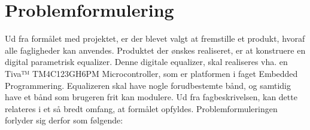 \section{Problemformulering}
%
%


%
Ud fra formålet med projektet, er der blevet valgt at fremstille et produkt, hvoraf alle fagligheder kan anvendes. Produktet der ønskes realiseret, er at konstruere en digital parametrisk equalizer. Denne digitale equalizer, skal realiseres vha. en Tiva™ TM4C123GH6PM Microcontroller, som er platformen i faget Embedded Programmering. Equalizeren skal have nogle forudbestemte bånd, og samtidig have et bånd som brugeren frit kan modulere. Ud fra fagbeskrivelsen, kan dette relateres i et så bredt omfang, at formålet opfyldes. Problemformuleringen forlyder sig derfor som følgende: \\

